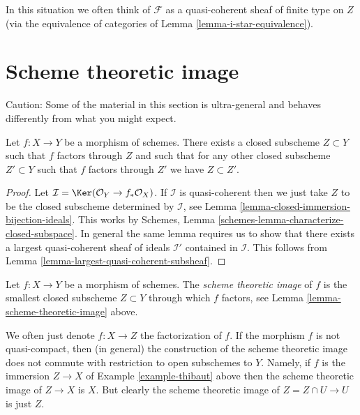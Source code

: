 \noindent
In this situation we often think of $\mathcal{F}$ as a quasi-coherent
sheaf of finite type on $Z$ (via the equivalence of categories of
Lemma \ref{lemma-i-star-equivalence}).













\section{Scheme theoretic image}
\label{section-scheme-theoretic-image}

\noindent
Caution: Some of the material in this section is ultra-general and
behaves differently from what you might expect.

\begin{lemma}
\label{lemma-scheme-theoretic-image}
Let $f : X \to Y$ be a morphism of schemes. There exists a closed
subscheme $Z \subset Y$ such that $f$ factors through $Z$ and such
that for any other closed subscheme $Z' \subset Y$ such that $f$
factors through $Z'$ we have $Z \subset Z'$.
\end{lemma}

\begin{proof}
Let $\mathcal{I} = \Ker(\mathcal{O}_Y \to f_*\mathcal{O}_X)$.
If $\mathcal{I}$ is quasi-coherent then we just take $Z$ to be the
closed subscheme determined by $\mathcal{I}$, see
Lemma \ref{lemma-closed-immersion-bijection-ideals}. This works by
Schemes, Lemma \ref{schemes-lemma-characterize-closed-subspace}.
In general the same lemma requires us to show that there exists
a largest quasi-coherent sheaf of ideals $\mathcal{I}'$ contained in
$\mathcal{I}$.
This follows from Lemma \ref{lemma-largest-quasi-coherent-subsheaf}.
\end{proof}

\begin{definition}
\label{definition-scheme-theoretic-image}
Let $f : X \to Y$ be a morphism of schemes. The {\it scheme theoretic image}
of $f$ is the smallest closed subscheme $Z \subset Y$ through which $f$
factors, see Lemma \ref{lemma-scheme-theoretic-image} above.
\end{definition}

\noindent
We often just denote $f : X \to Z$ the factorization of $f$.
If the morphism $f$ is not quasi-compact, then (in general) the
construction of the scheme theoretic image does not commute with
restriction to open subschemes to $Y$. Namely, if $f$ is the
immersion $Z \to X$ of Example \ref{example-thibaut} above then
the scheme theoretic image of $Z \to X$ is $X$. But clearly the
scheme theoretic image of $Z = Z \cap U \to U$ is just $Z$.

